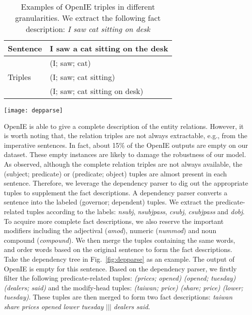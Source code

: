 \documentclass[letterpaper]{article} \usepackage{aaai18}  \usepackage{times}  \usepackage{helvet}  \usepackage{courier}  \usepackage{url}  \usepackage{graphicx}  \usepackage{amsfonts}
\begin{document}
	\begin{table}[t]
		\centering
		\begin{tabular}{l|l}
			\hline
			Sentence                   & I saw a cat sitting on the desk \\ \hline
			\multirow{3}{*}{Triples} & (I; saw; cat)                \\ \cline{2-2} 
			& (I; saw; cat sitting)           \\ \cline{2-2} 
			& (I; saw; cat sitting on desk)   \\ \hline
		\end{tabular}
		\caption{Examples of OpenIE triples in different granularities. We extract the following fact description: \textit{I saw cat sitting on desk}}
		\label{tb:openie_triple}
	\end{table}
	
	\begin{figure*}
		\centering
		\texttt{[image: depparse]}
		\caption{A dependency tree example. The meaning of the dependency labels can be referred to \cite{de2008stanford}. We extract the following two fact descriptions: \textit{taiwan share prices opened lower tuesday} $|||$ \textit{dealers said}}
		\label{fig:depparse}
	\end{figure*}
	
	OpenIE is able to give a complete description of the entity relations.
	However, it is worth noting that, the relation triples are not always extractable, e.g., from the imperative sentences.
	In fact, about 15\% of the OpenIE outputs are empty on our dataset.
	These empty instances are likely to damage the robustness of our model.
	As observed, although the complete relation triples are not always available, the (subject; predicate) or (predicate; object) tuples are almost present in each sentence.
	Therefore, we leverage the dependency parser to dig out the appropriate tuples to supplement the fact descriptions.
	A dependency parser converts a sentence into the labeled (governor; dependent) tuples.
	We extract the predicate-related tuples according to the labels: \textit{nsubj}, \textit{nsubjpass}, \textit{csubj}, \textit{csubjpass} and \textit{dobj}.
	To acquire more complete fact descriptions, we also reserve the important modifiers including the adjectival (\textit{amod}), numeric (\textit{nummod}) and noun compound (\textit{compound}).
	We then merge the tuples containing the same words, and order words based on the original sentence to form the fact descriptions.
	Take the dependency tree in Fig.~\ref{fig:depparse} as an example.
	The output of OpenIE is empty for this sentence.
	Based on the dependency parser, we firstly filter the following predicate-related tuples: \textit{(prices; opened) (opened; tuesday) (dealers; said)} and the modify-head tuples: \textit{(taiwan; price) (share; price)  (lower; tuesday)}.
	These tuples are then merged to form two fact descriptions: \textit{taiwan share prices opened lower tuesday} $|||$ \textit{dealers said}.  
	
\end{document}
